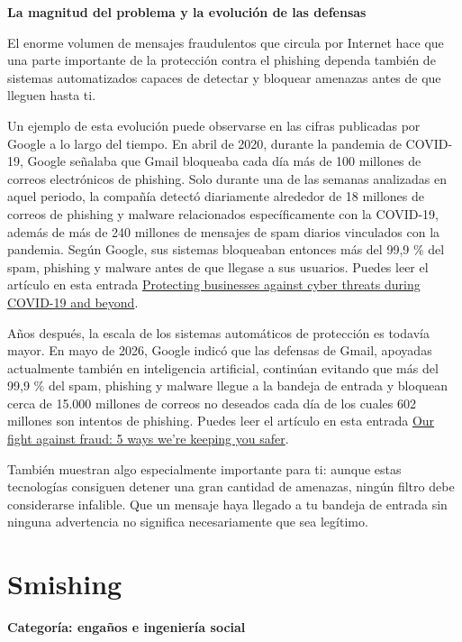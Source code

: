 \documentclass[
  spanish,
  a4paper,
  openany]{book}
\begin{document}
\textbf{La magnitud del problema y la evolución de las defensas}

El enorme volumen de mensajes fraudulentos que circula por Internet hace que una parte importante de la protección contra el phishing dependa también de sistemas automatizados capaces de detectar y bloquear amenazas antes de que lleguen hasta ti.

Un ejemplo de esta evolución puede observarse en las cifras publicadas por Google a lo largo del tiempo. En abril de 2020, durante la pandemia de COVID-19, Google señalaba que Gmail bloqueaba cada día más de 100 millones de correos electrónicos de phishing. Solo durante una de las semanas analizadas en aquel periodo, la compañía detectó diariamente alrededor de 18 millones de correos de phishing y malware relacionados específicamente con la COVID-19, además de más de 240 millones de mensajes de spam diarios vinculados con la pandemia. Según Google, sus sistemas bloqueaban entonces más del 99,9 \% del spam, phishing y malware antes de que llegase a sus usuarios. Puedes leer el artículo en esta entrada \href{https://cloud.google.com/blog/products/identity-security/protecting-against-cyber-threats-during-covid-19-and-beyond}{Protecting businesses against cyber threats during COVID-19 and beyond}.

Años después, la escala de los sistemas automáticos de protección es todavía mayor. En mayo de 2026, Google indicó que las defensas de Gmail, apoyadas actualmente también en inteligencia artificial, continúan evitando que más del 99,9 \% del spam, phishing y malware llegue a la bandeja de entrada y bloquean cerca de 15.000 millones de correos no deseados cada día de los cuales 602 millones son intentos de phishing. Puedes leer el artículo en esta entrada \href{https://blog.google/innovation-and-ai/technology/safety-security/scams-fraud-protection/}{Our fight against fraud: 5 ways we're keeping you safer}.

También muestran algo especialmente importante para ti: aunque estas tecnologías consiguen detener una gran cantidad de amenazas, ningún filtro debe considerarse infalible. Que un mensaje haya llegado a tu bandeja de entrada sin ninguna advertencia no significa necesariamente que sea legítimo.

\section{Smishing}\label{smishing}

\textbf{Categoría: engaños e ingeniería social}
\end{document}
